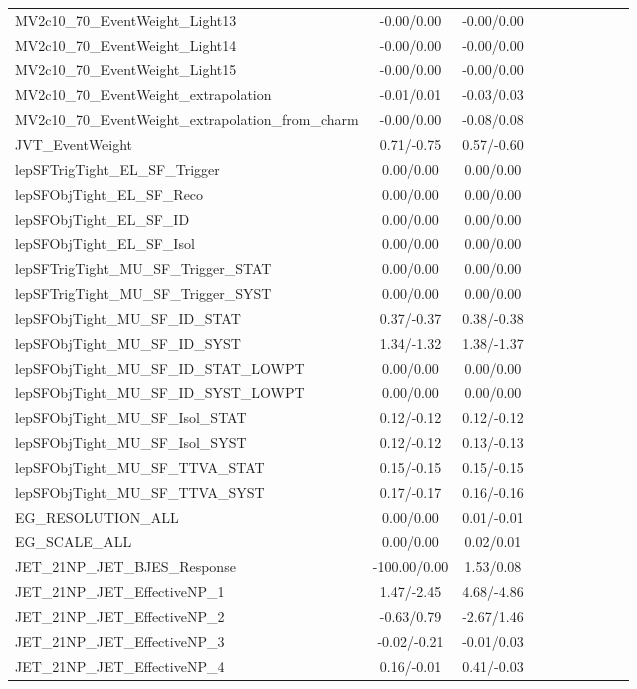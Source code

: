 \begin{table}[h]
\begin{center}
\begin{tabular}{l|ccccccccc}
MV2c10\_70\_EventWeight\_Light13 &-0.00/0.00 &-0.00/0.00 \\
MV2c10\_70\_EventWeight\_Light14 &-0.00/0.00 &-0.00/0.00 \\
MV2c10\_70\_EventWeight\_Light15 &-0.00/0.00 &-0.00/0.00 \\
MV2c10\_70\_EventWeight\_extrapolation &-0.01/0.01 &-0.03/0.03 \\
MV2c10\_70\_EventWeight\_extrapolation\_from\_charm &-0.00/0.00 &-0.08/0.08 \\
JVT\_EventWeight &0.71/-0.75 &0.57/-0.60 \\
lepSFTrigTight\_EL\_SF\_Trigger &0.00/0.00 &0.00/0.00 \\
lepSFObjTight\_EL\_SF\_Reco &0.00/0.00 &0.00/0.00 \\
lepSFObjTight\_EL\_SF\_ID &0.00/0.00 &0.00/0.00 \\
lepSFObjTight\_EL\_SF\_Isol &0.00/0.00 &0.00/0.00 \\
lepSFTrigTight\_MU\_SF\_Trigger\_STAT &0.00/0.00 &0.00/0.00 \\
lepSFTrigTight\_MU\_SF\_Trigger\_SYST &0.00/0.00 &0.00/0.00 \\
lepSFObjTight\_MU\_SF\_ID\_STAT &0.37/-0.37 &0.38/-0.38 \\
lepSFObjTight\_MU\_SF\_ID\_SYST &1.34/-1.32 &1.38/-1.37 \\
lepSFObjTight\_MU\_SF\_ID\_STAT\_LOWPT &0.00/0.00 &0.00/0.00 \\
lepSFObjTight\_MU\_SF\_ID\_SYST\_LOWPT &0.00/0.00 &0.00/0.00 \\
lepSFObjTight\_MU\_SF\_Isol\_STAT &0.12/-0.12 &0.12/-0.12 \\
lepSFObjTight\_MU\_SF\_Isol\_SYST &0.12/-0.12 &0.13/-0.13 \\
lepSFObjTight\_MU\_SF\_TTVA\_STAT &0.15/-0.15 &0.15/-0.15 \\
lepSFObjTight\_MU\_SF\_TTVA\_SYST &0.17/-0.17 &0.16/-0.16 \\
EG\_RESOLUTION\_ALL &0.00/0.00 &0.01/-0.01 \\
EG\_SCALE\_ALL &0.00/0.00 &0.02/0.01 \\
JET\_21NP\_JET\_BJES\_Response &-100.00/0.00 &1.53/0.08 \\
JET\_21NP\_JET\_EffectiveNP\_1 &1.47/-2.45 &4.68/-4.86 \\
JET\_21NP\_JET\_EffectiveNP\_2 &-0.63/0.79 &-2.67/1.46 \\
JET\_21NP\_JET\_EffectiveNP\_3 &-0.02/-0.21 &-0.01/0.03 \\
JET\_21NP\_JET\_EffectiveNP\_4 &0.16/-0.01 &0.41/-0.03 \\

\end{tabular}
\end{center}
\end{table}
